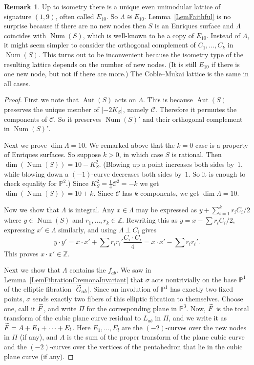 \documentclass[11pt]{article}
\theoremstyle{definition}
\newtheorem{rema}[theo]{Remark}
\numberwithin{equation}{section}
\numberwithin{figure}{section}
\numberwithin{table}{section}
\let\oldtilde\tilde
\renewcommand*\tilde[1]{\mathchoice{\widetilde{#1}}{\widetilde{#1}}{\oldtilde{#1}}{\oldtilde{#1}}}
\newcommand*\Gtilde{\tilde G}
\newcommand*\Ftilde{\tilde F}
\newcommand*\Z{\mathbb{Z}}
\let\iso\cong
\newcommand{\bbP}{{\mathbb{P}}}
\DeclareMathOperator{\Aut}{Aut}
\DeclareMathOperator{\Num}{Num}
\newcommand{\calC}{\mathcal{C}}
\begin{document}
\begin{rema}\label{rkMukaiLattice}
Up to isometry there is a unique even unimodular lattice of signature $(1,9)$, often called $E_{10}$. So $\Lambda\iso E_{10}$. Lemma~\ref{LemFaithful} is no surprise because if there are no new nodes then $S$ is an Enriques surface and $\Lambda$ coincides with $\Num(S)$, which is well-known to be a copy of $E_{10}$. Instead of $\Lambda$, it might seem simpler to consider the orthogonal complement of $C_1,\dots,C_k$ in $\Num(S)$. This turns out to be inconvenient because the isometry type of the resulting lattice depends on the number of new nodes. (It is still $E_{10}$ if there is one new node, but not if there are more.) The Coble--Mukai lattice is the same in all cases.
\end{rema}

\begin{proof}
First we note that $\Aut(S)$ acts on $\Lambda$. This is because $\Aut(S)$ preserves the unique member of $|-2K_S|$, namely $\calC$. Therefore it permutes the components of $\calC$. So it preserves $\Num(S)'$ and their orthogonal complement in $\Num(S)'$.

Next we prove $\dim\Lambda=10$. We remarked above that the $k=0$ case is a property of Enriques surfaces. So suppose $k>0$, in which case $S$ is rational. Then $\dim(\Num(S))=10-K_S^2$. (Blowing up a point increases both sides by~$1$, while blowing down a $(-1)$-curve decreases both sides by~$1$. So it is enough to check equality for $\bbP^2$.) Since $K_S^2=\frac14\calC^2=-k$ we get $\dim(\Num(S))=10+k$. Since $\calC$ has $k$ components, we get $\dim\Lambda=10$.

Now we show that $\Lambda$ is integral. Any $x\in\Lambda$ may be expressed as $y+\sum_{i=1}^k r_iC_i/2$ where $y\in\Num(S)$ and $r_1,\dots,r_k\in\Z$. Rewriting this as $y=x-\sum r_i C_i/2$, expressing $x'\in\Lambda$ similarly, and using $\Lambda\perp C_i$ gives
\begin{equation*}
y\cdot y' = x\cdot x' + \sum r_ir_i'\frac{C_i\cdot C_i}{4} = x\cdot x'-\sum r_i r_i'.
\end{equation*}
This proves $x\cdot x'\in\Z$.


Next we show that $\Lambda$ contains the $f_{ab}$. We saw in Lemma~\ref{LemFibrationCremonaInvariant} that $\sigma$ acts nontrivially on the base $\bbP^1$ of the elliptic fibration $|\Gtilde_{ab}|$. Since an involution of $\bbP^1$ has exactly two fixed points, $\sigma$ sends exactly two fibers of this elliptic fibration to themselves. Choose one, call it $\Ftilde$, and write $\Pi$ for the corresponding plane in $\bbP^3$. Now, $\Ftilde$ is the total transform of the cubic plane curve residual to $L_{ab}$ in $\Pi$, and we write it as $\Ftilde=A+E_1+\cdots+E_l$. Here $E_1,\dots,E_l$ are the $(-2)$-curves over the new nodes in $\Pi$ (if any), and $A$ is the sum of the proper transform of the plane cubic curve and the $(-2)$-curves over the vertices of the pentahedron that lie in the cubic plane curve (if any).


\end{proof}
\end{document}
